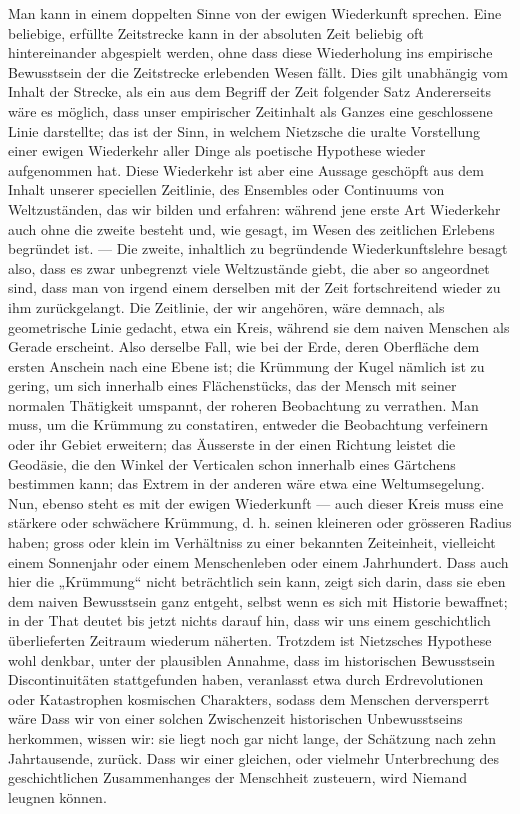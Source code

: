 Man kann in einem doppelten Sinne von der ewigen Wiederkunft sprechen. Eine beliebige, erfüllte Zeitstrecke kann in der absoluten Zeit beliebig oft hintereinander abgespielt werden, ohne dass diese Wiederholung ins empirische Bewusstsein der die Zeitstrecke erlebenden Wesen fällt. Dies gilt unabhängig vom Inhalt der Strecke, als ein aus dem Begriff der Zeit folgender Satz  Andererseits wäre es möglich, dass unser empirischer Zeitinhalt als Ganzes eine geschlossene Linie darstellte; das ist der Sinn, in welchem Nietzsche die uralte Vorstellung einer ewigen Wiederkehr aller Dinge als poetische Hypothese wieder aufgenommen hat. Diese Wiederkehr ist aber eine Aussage  geschöpft aus dem Inhalt unserer speciellen Zeitlinie, des Ensembles oder Continuums von Weltzuständen, das wir bilden und erfahren: während jene erste Art Wiederkehr auch ohne die zweite besteht und, wie gesagt, im Wesen des zeitlichen Erlebens begründet ist. — Die zweite, inhaltlich zu begründende Wiederkunftslehre besagt also, dass es zwar unbegrenzt viele Weltzustände giebt, die aber so angeordnet sind, dass man von irgend einem derselben mit der Zeit fortschreitend wieder zu ihm zurückgelangt. Die Zeitlinie, der wir angehören, wäre demnach, als geometrische Linie gedacht, etwa ein Kreis, während sie dem naiven Menschen als Gerade erscheint. Also derselbe Fall, wie bei der Erde, deren Oberfläche dem ersten Anschein nach eine Ebene ist; die Krümmung der Kugel nämlich ist zu gering, um sich innerhalb eines Flächenstücks, das der Mensch mit seiner normalen Thätigkeit umspannt, der roheren Beobachtung zu verrathen. Man muss, um die Krümmung zu constatiren, entweder die Beobachtung verfeinern oder ihr Gebiet erweitern; das Äusserste in der einen Richtung leistet die Geodäsie, die den Winkel der Verticalen schon innerhalb eines Gärtchens bestimmen kann; das Extrem in der anderen wäre etwa eine Weltumsegelung. Nun, ebenso steht es mit der ewigen Wiederkunft — auch dieser Kreis muss eine stärkere oder schwächere Krümmung, d. h. seinen kleineren oder grösseren Radius haben; gross oder klein im Verhältniss zu einer bekannten Zeiteinheit, vielleicht einem Sonnenjahr oder einem Menschenleben oder einem Jahrhundert. Dass auch hier die „Krümmung“ nicht beträchtlich sein kann, zeigt sich darin, dass sie eben dem naiven Bewusstsein ganz entgeht, selbst wenn es sich mit Historie bewaffnet; in der That deutet bis jetzt nichts darauf hin, dass wir uns einem geschichtlich überlieferten Zeitraum wiederum  näherten. Trotzdem ist Nietzsches Hypothese wohl denkbar, unter der plausiblen Annahme, dass im historischen Bewusstsein Discontinuitäten stattgefunden haben, veranlasst etwa durch Erdrevolutionen oder Katastrophen kosmischen Charakters, sodass dem Menschen derversperrt wäre Dass wir von einer solchen Zwischenzeit historischen Unbewusstseins herkommen, wissen wir: sie liegt noch gar nicht lange, der Schätzung nach zehn Jahrtausende, zurück. Dass wir  einer gleichen, oder vielmehr  Unterbrechung des geschichtlichen Zusammenhanges der Menschheit zusteuern, wird Niemand leugnen können. 
